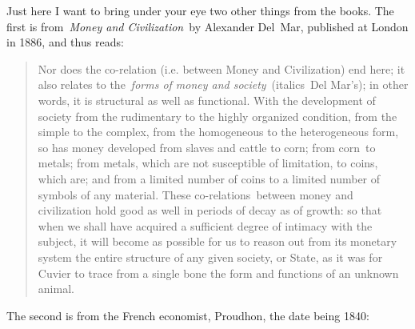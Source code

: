 \documentclass[twoside,symmetric,nobib,justified]{tufte-book}
\begin{document}
\newpage Just here I want to bring under your eye two other things from the
books. The first is from~\emph{Money and Civilization}~by Alexander
Del~Mar, published at London in 1886, and thus reads:~

\begin{quote}
Nor does the co-relation (i.e. between Money and Civilization) end here;
it also relates to the~\emph{forms of money and society}~(italics~Del
Mar's); in other words, it is structural as well as functional. With the
development of society from the rudimentary to the highly organized
condition, from the simple to the complex, from the homogeneous to the
heterogeneous form, so has money developed from slaves and cattle to
corn; from corn~to metals; from metals, which are not susceptible of
limitation, to coins, which are; and from a limited number of coins to a
limited number of symbols of any material. These co-relations~between
money and civilization hold good as well in periods of decay as of
growth: so that when we shall have acquired a sufficient degree of
intimacy with the subject, it will become as possible for us to reason
out from its monetary system the entire structure of any given society,
or State, as it was for Cuvier to trace from a single bone the form and
functions of an unknown animal.~
\end{quote}

The second is from the French economist, Proudhon, the date being 1840:~
\end{document}
